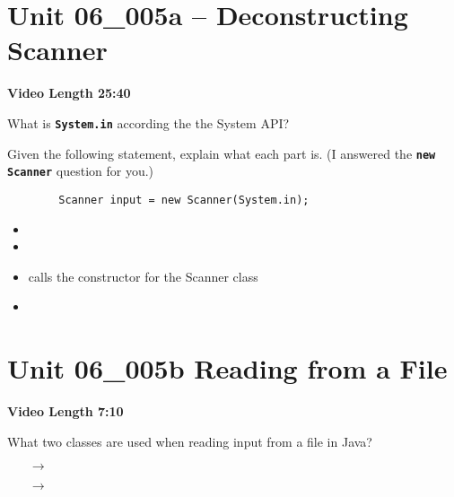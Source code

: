 \documentclass[letterpaper,12pt]{exam}
\newcommand{\unit}{Unit 06}
\begin{document}
\section*{\unit\_005a -- Deconstructing Scanner} %
\par{\selectfont\textbf{Video Length 25:40}}

\begin{questions}
\begin{samepage}
    \question What is \texttt{\textbf{System.in}} according the the System API?
    \vspace{5mm}
\end{samepage}

\begin{samepage}
    \question Given the following statement, explain what each part is.  (I answered the \texttt{\textbf{new Scanner}} question for you.)
    \begin{verbatim}
        Scanner input = new Scanner(System.in);
    \end{verbatim}
    \begin{itemize}
        \item {} 
        \vspace{5mm}
        \item {}
        \vspace{5mm}
        \item {} {\LARGE\color{Blue}\selectfont calls the constructor for the Scanner class}
        \vspace{5mm}
        \item {}
        \vspace{5mm}
       \end{itemize}
\end{samepage}

\section*{\unit\_005b Reading from a File} %
\noindent \textbf{Video Length 7:10}

\begin{samepage}
    \question What two classes are used when reading input from a file in Java?
      \begin{itemize}
        \item [$\rightarrow$]
        \vspace{5mm}
        \item [$\rightarrow$]
       \end{itemize}
\end{samepage}


\end{questions}
\end{document}
